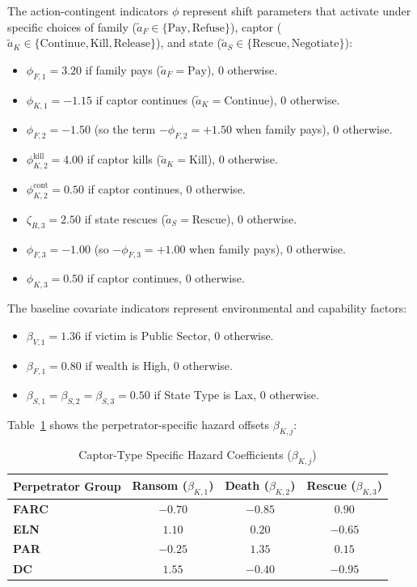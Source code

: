 \documentclass[12pt]{article}
\numberwithin{equation}{section}
\numberwithin{table}{section}
\begin{document}
The action-contingent indicators $\phi$ represent shift parameters that activate under specific choices of family ($\tilde{a}_F \in \{\text{Pay}, \text{Refuse}\}$), captor ($\tilde{a}_K \in \{\text{Continue}, \text{Kill}, \text{Release}\}$), and state ($\tilde{a}_S \in \{\text{Rescue}, \text{Negotiate}\}$):
\begin{itemize}
    \item $\phi_{F,1} = 3.20$ if family pays ($\tilde{a}_F = \text{Pay}$), 0 otherwise.
    \item $\phi_{K,1} = -1.15$ if captor continues ($\tilde{a}_K = \text{Continue}$), 0 otherwise.
    \item $\phi_{F,2} = -1.50$ (so the term $-\phi_{F,2} = +1.50$ when family pays), 0 otherwise.
    \item $\phi_{K,2}^{\text{kill}} = 4.00$ if captor kills ($\tilde{a}_K = \text{Kill}$), 0 otherwise.
    \item $\phi_{K,2}^{\text{cont}} = 0.50$ if captor continues, 0 otherwise.
    \item $\zeta_{R,3} = 2.50$ if state rescues ($\tilde{a}_S = \text{Rescue}$), 0 otherwise.
    \item $\phi_{F,3} = -1.00$ (so $-\phi_{F,3} = +1.00$ when family pays), 0 otherwise.
    \item $\phi_{K,3} = 0.50$ if captor continues, 0 otherwise.
\end{itemize}

The baseline covariate indicators represent environmental and capability factors:
\begin{itemize}
    \item $\beta_{V,1} = 1.36$ if victim is Public Sector, 0 otherwise.
    \item $\beta_{F,1} = 0.80$ if wealth is High, 0 otherwise.
    \item $\beta_{S,1} = \beta_{S,2} = \beta_{S,3} = 0.50$ if State Type is Lax, 0 otherwise.
\end{itemize}

Table~\ref{tab:hazard-betas} shows the perpetrator-specific hazard offsets $\beta_{K,j}$:
\begin{table}[h!]
\centering
\caption{Captor-Type Specific Hazard Coefficients ($\beta_{K,j}$)}
\label{tab:hazard-betas}
\begin{tabular}{lccc}
\toprule
\textbf{Perpetrator Group} & \textbf{Ransom ($\beta_{K,1}$)} & \textbf{Death ($\beta_{K,2}$)} & \textbf{Rescue ($\beta_{K,3}$)} \\
\midrule
\textbf{FARC} & $-0.70$ & $-0.85$ & $0.90$ \\
\textbf{ELN} & $1.10$ & $0.20$ & $-0.65$ \\
\textbf{PAR} & $-0.25$ & $1.35$ & $0.15$ \\
\textbf{DC} & $1.55$ & $-0.40$ & $-0.95$ \\
\bottomrule
\end{tabular}
\end{table}
\end{document}
